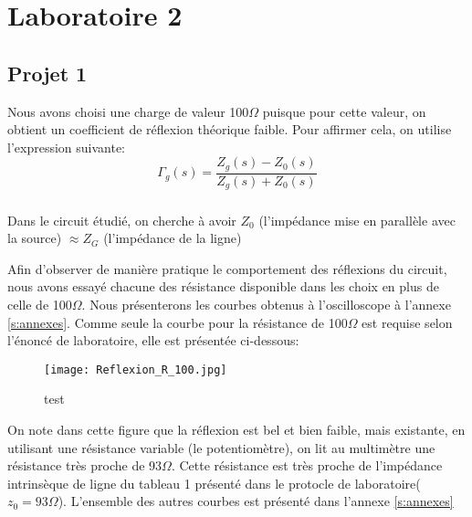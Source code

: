 



\label{s:experimentation}
\chapter{Laboratoire 2}
\section{Projet 1}
Nous avons choisi une charge de valeur 100$\Omega$ puisque pour cette valeur, on obtient un coefficient de réflexion théorique faible. Pour affirmer cela, on utilise l'expression suivante:
\begin{equation}
\Gamma_g (s) = \frac{Z_g(s) - Z_0(s)}{Z_g(s) + Z_0(s)}
 \end{equation} 

\paragraph{}Dans le circuit étudié, on cherche à avoir $Z_0$ (l'impédance mise en parallèle avec la source) $\approx Z_G$ (l'impédance de la ligne)
\newpage

Afin d'observer de manière pratique le comportement des réflexions du circuit, nous avons essayé chacune des résistance disponible dans les choix en plus de celle de 100$\Omega$. Nous présenterons les courbes obtenus à l'oscilloscope à l'annexe \ref{s:annexes}. Comme seule la courbe pour la résistance de 100$\Omega$ est requise selon l'énoncé de laboratoire, elle est présentée ci-dessous:

\begin{figure}[htb]
\begin{center}
\texttt{[image: Reflexion\_R\_100.jpg]}
\caption{test}
\label{Reflexion_R_100}
\end{center}
\end{figure}

On note dans cette figure que la réflexion est bel et bien faible, mais existante, en utilisant une résistance variable (le potentiomètre), on lit au multimètre une résistance très proche de 93$\Omega$. Cette résistance est très proche de l'impédance intrinsèque de ligne du tableau 1 présenté dans le protocle de laboratoire( $z_0 = 93\Omega$). L'ensemble des autres courbes est présenté dans l'annexe \ref{s:annexes}

